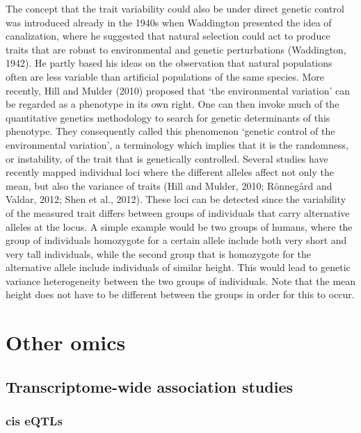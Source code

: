 \documentclass[
]{book}
\begin{document}
The concept that the trait variability could also be under direct genetic control was introduced already in the 1940s when Waddington presented the idea of canalization, where he suggested that natural selection could act to produce traits that are robust to environmental and genetic perturbations (Waddington, 1942). He partly based his ideas on the observation that natural populations often are less variable than artificial populations of the same species. More recently, Hill and Mulder (2010) proposed that `the environmental variation' can be regarded as a phenotype in its own right. One can then invoke much of the quantitative genetics methodology to search for genetic determinants of this phenotype. They consequently called this phenomenon `genetic control of the environmental variation', a terminology which implies that it is the randomness, or instability, of the trait that is genetically controlled. Several studies have recently mapped individual loci where the different alleles affect not only the mean, but also the variance of traits (Hill and Mulder, 2010; Rönnegård and Valdar, 2012; Shen et al., 2012). These loci can be detected since the variability of the measured trait differs between groups of individuals that carry alternative alleles at the locus. A simple example would be two groups of humans, where the group of individuals homozygote for a certain allele include both very short and very tall individuals, while the second group that is homozygote for the alternative allele include individuals of similar height. This would lead to genetic variance heterogeneity between the two groups of individuals. Note that the mean height does not have to be different between the groups in order for this to occur.

\hypertarget{other-omics}{%
\chapter{Other omics}\label{other-omics}}

\hypertarget{transcriptome-wide-association-studies}{%
\section{Transcriptome-wide association studies}\label{transcriptome-wide-association-studies}}

\hypertarget{cis-eqtls}{%
\subsection{cis eQTLs}\label{cis-eqtls}}
\end{document}
